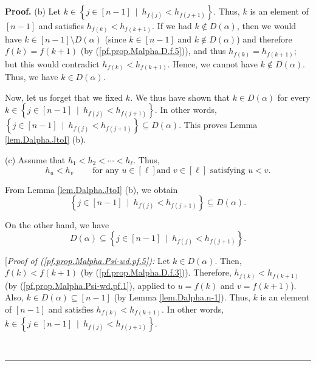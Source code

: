 \documentclass[numbers=enddot,12pt,final,onecolumn,notitlepage,abstracton]{scrartcl}
\theoremstyle{definition}
\newenvironment{proof}[1][Proof]{\noindent\textbf{#1.} }{\ \rule{0.5em}{0.5em}}
\newenvironment{verlong}{}{}
\begin{document}
\begin{verlong}
\begin{footnotesize}
\begin{proof}
(b) Let $k\in\left\{  j\in\left[  n-1\right]  \ \mid\ h_{f\left(  j\right)
}<h_{f\left(  j+1\right)  }\right\}  $. Thus, $k$ is an element of $\left[
n-1\right]  $ and satisfies $h_{f\left(  k\right)  }<h_{f\left(  k+1\right)
}$. If we had $k\notin D\left(  \alpha\right)  $, then we would have
$k\in\left[  n-1\right]  \setminus D\left(  \alpha\right)  $ (since
$k\in\left[  n-1\right]  $ and $k\notin D\left(  \alpha\right)  $) and
therefore $f\left(  k\right)  =f\left(  k+1\right)  $ (by
(\ref{pf.prop.Malpha.D.f.5})), and thus $h_{f\left(  k\right)  }=h_{f\left(
k+1\right)  }$; but this would contradict $h_{f\left(  k\right)  }<h_{f\left(
k+1\right)  }$. Hence, we cannot have $k\notin D\left(  \alpha\right)  $.
Thus, we have $k\in D\left(  \alpha\right)  $.

Now, let us forget that we fixed $k$. We thus have shown that $k\in D\left(
\alpha\right)  $ for every \newline
$k\in\left\{  j\in\left[  n-1\right]
\ \mid\ h_{f\left(  j\right)  }<h_{f\left(  j+1\right)  }\right\}  $. In other
words, $\left\{  j\in\left[  n-1\right]  \ \mid\ h_{f\left(  j\right)
}<h_{f\left(  j+1\right)  }\right\}  \subseteq D\left(  \alpha\right)  $. This
proves Lemma \ref{lem.Dalpha.JtoI} (b).

(c) Assume that $h_{1}<h_{2}<\cdots<h_{\ell}$. Thus,%
\begin{equation}
h_{u}<h_{v}\ \ \ \ \ \ \ \ \ \ \text{for any }u\in\left[  \ell\right]  \text{
and }v\in\left[  \ell\right]  \text{ satisfying }u<v.
\label{pf.prop.Malpha.Psi-wd.pf.1}%
\end{equation}


From Lemma \ref{lem.Dalpha.JtoI} (b), we obtain%
\begin{equation}
\left\{  j\in\left[  n-1\right]  \ \mid\ h_{f\left(  j\right)  }<h_{f\left(
j+1\right)  }\right\}  \subseteq D\left(  \alpha\right)  .
\label{pf.prop.Malpha.Psi-wd.pf.4}%
\end{equation}


On the other hand, we have%
\begin{equation}
D\left(  \alpha\right)  \subseteq\left\{  j\in\left[  n-1\right]
\ \mid\ h_{f\left(  j\right)  }<h_{f\left(  j+1\right)  }\right\}  .
\label{pf.prop.Malpha.Psi-wd.pf.5}%
\end{equation}


[\textit{Proof of (\ref{pf.prop.Malpha.Psi-wd.pf.5}):} Let $k\in D\left(
\alpha\right)  $. Then, $f\left(  k\right)  <f\left(  k+1\right)  $ (by
(\ref{pf.prop.Malpha.D.f.3})). Therefore, $h_{f\left(  k\right)  }<h_{f\left(
k+1\right)  }$ (by (\ref{pf.prop.Malpha.Psi-wd.pf.1}), applied to $u=f\left(
k\right)  $ and $v=f\left(  k+1\right)  $). Also, $k\in D\left(
\alpha\right)  \subseteq\left[  n-1\right]  $ (by Lemma \ref{lem.Dalpha.n-1}).
Thus, $k$ is an element of $\left[  n-1\right]  $ and satisfies $h_{f\left(
k\right)  }<h_{f\left(  k+1\right)  }$. In other words, $k\in\left\{
j\in\left[  n-1\right]  \ \mid\ h_{f\left(  j\right)  }<h_{f\left(
j+1\right)  }\right\}  $.


\end{proof}
\end{footnotesize}
\end{verlong}
\end{document}
